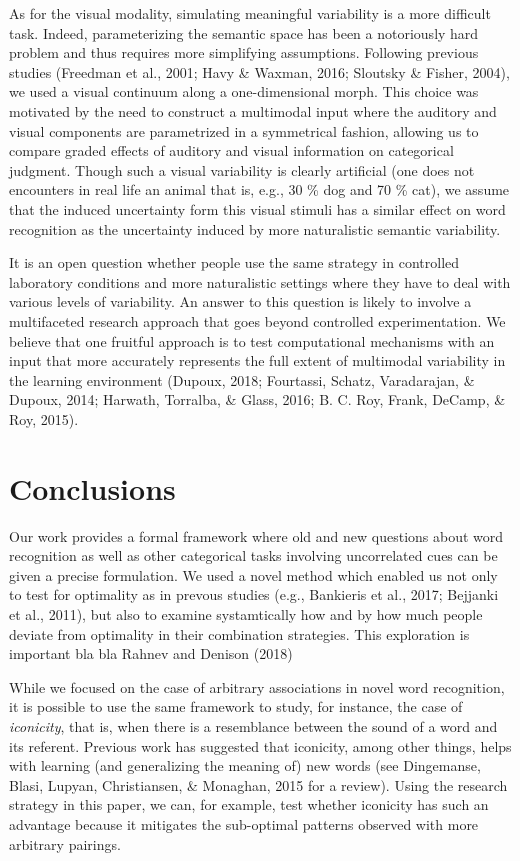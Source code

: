 \documentclass[english,,man,floatsintext]{apa6}
\theoremstyle{definition}
\theoremstyle{definition}
\theoremstyle{definition}
\theoremstyle{remark}
\begin{document}
As for the visual modality, simulating meaningful variability is a more
difficult task. Indeed, parameterizing the semantic space has been a
notoriously hard problem and thus requires more simplifying assumptions.
Following previous studies (Freedman et al., 2001; Havy \& Waxman, 2016;
Sloutsky \& Fisher, 2004), we used a visual continuum along a
one-dimensional morph. This choice was motivated by the need to
construct a multimodal input where the auditory and visual components
are parametrized in a symmetrical fashion, allowing us to compare graded
effects of auditory and visual information on categorical judgment.
Though such a visual variability is clearly artificial (one does not
encounters in real life an animal that is, e.g., 30 \% dog and 70 \%
cat), we assume that the induced uncertainty form this visual stimuli
has a similar effect on word recognition as the uncertainty induced by
more naturalistic semantic variability.

It is an open question whether people use the same strategy in
controlled laboratory conditions and more naturalistic settings where
they have to deal with various levels of variability. An answer to this
question is likely to involve a multifaceted research approach that goes
beyond controlled experimentation. We believe that one fruitful approach
is to test computational mechanisms with an input that more accurately
represents the full extent of multimodal variability in the learning
environment (Dupoux, 2018; Fourtassi, Schatz, Varadarajan, \& Dupoux,
2014; Harwath, Torralba, \& Glass, 2016; B. C. Roy, Frank, DeCamp, \&
Roy, 2015).

\section{Conclusions}\label{conclusions}

Our work provides a formal framework where old and new questions about
word recognition as well as other categorical tasks involving
uncorrelated cues can be given a precise formulation. We used a novel
method which enabled us not only to test for optimality as in prevous
studies (e.g., Bankieris et al., 2017; Bejjanki et al., 2011), but also
to examine systamtically how and by how much people deviate from
optimality in their combination strategies. This exploration is
important bla bla Rahnev and Denison (2018)

While we focused on the case of arbitrary associations in novel word
recognition, it is possible to use the same framework to study, for
instance, the case of \textit{iconicity}, that is, when there is a
resemblance between the sound of a word and its referent. Previous work
has suggested that iconicity, among other things, helps with learning
(and generalizing the meaning of) new words (see Dingemanse, Blasi,
Lupyan, Christiansen, \& Monaghan, 2015 for a review). Using the
research strategy in this paper, we can, for example, test whether
iconicity has such an advantage because it mitigates the sub-optimal
patterns observed with more arbitrary pairings.
\end{document}

